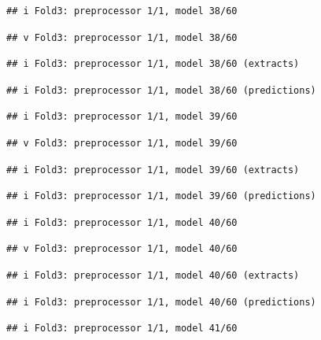 \documentclass[
]{article}
\begin{document}
\begin{verbatim}
## i Fold3: preprocessor 1/1, model 38/60
\end{verbatim}

\begin{verbatim}
## v Fold3: preprocessor 1/1, model 38/60
\end{verbatim}

\begin{verbatim}
## i Fold3: preprocessor 1/1, model 38/60 (extracts)
\end{verbatim}

\begin{verbatim}
## i Fold3: preprocessor 1/1, model 38/60 (predictions)
\end{verbatim}

\begin{verbatim}
## i Fold3: preprocessor 1/1, model 39/60
\end{verbatim}

\begin{verbatim}
## v Fold3: preprocessor 1/1, model 39/60
\end{verbatim}

\begin{verbatim}
## i Fold3: preprocessor 1/1, model 39/60 (extracts)
\end{verbatim}

\begin{verbatim}
## i Fold3: preprocessor 1/1, model 39/60 (predictions)
\end{verbatim}

\begin{verbatim}
## i Fold3: preprocessor 1/1, model 40/60
\end{verbatim}

\begin{verbatim}
## v Fold3: preprocessor 1/1, model 40/60
\end{verbatim}

\begin{verbatim}
## i Fold3: preprocessor 1/1, model 40/60 (extracts)
\end{verbatim}

\begin{verbatim}
## i Fold3: preprocessor 1/1, model 40/60 (predictions)
\end{verbatim}

\begin{verbatim}
## i Fold3: preprocessor 1/1, model 41/60
\end{verbatim}
\end{document}
